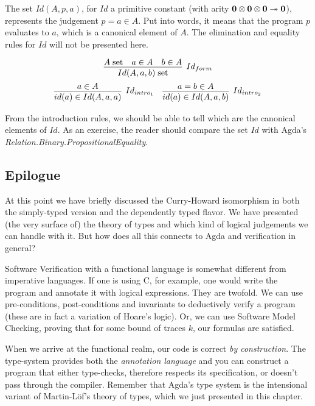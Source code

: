 The set $Id(A, p, a)$, for $Id$ a primitive constant (with arity $\textbf{0} \otimes \textbf{0} \otimes \textbf{0} \twoheadrightarrow \textbf{0}$),
represents the judgement $p = a \in A$. Put into words, it means that the program $p$ evaluates to $a$,
which is a canonical element of $A$. The elimination and equality rules for $Id$ will not be presented here.

\[
  \infer[Id_{form}]
        {\isset{Id(A, a, b)}}
        { \isset{A}
        & a \in A
        & b \in A
        }
\]
\[
\begin{array}{c c}
  \infer[Id_{intro_1}]
        {id(a) \in Id(A, a, a)}
        {a \in A}
&
  \infer[Id_{intro_2}]
        {id(a) \in Id(A, a, b)}
        {a = b \in A}
\end{array}
\]

From the introduction rules, we should be able to tell which are the canonical elements of $Id$.
As an exercise, the reader should compare the set $Id$ with Agda's \emph{Relation.Binary.PropositionalEquality}.

\subsection{Epilogue}

At this point we have briefly discussed the Curry-Howard isomorphism in both the simply-typed
version and the dependently typed flavor. We have presented (the very surface of) the theory
of types and which kind of logical judgements we can handle with it. But how does all this connects 
to Agda and verification in general?

Software Verification with a functional language is somewhat different from imperative languages. 
If one is using C, for example, one would write the program and annotate it with logical expressions.
They are twofold. We can use pre-conditions, post-conditions and invariants to deductively verify a program
(these are in fact a variation of Hoare's logic). Or, we can use Software Model Checking, proving
that for some bound of traces $k$, our formulas are satisfied.

When we arrive at the functional realm, our code is correct \emph{by construction}. The type-system
provides both the \emph{annotation language} and you can construct a program that either type-checks,
therefore respects its specification, or doesn't pass through the compiler. Remember that Agda's
type system is the intensional variant of Martin-L\"{o}f's theory of types, which we just presented
in this chapter.

